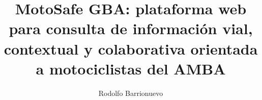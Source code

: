 \documentclass[%
    language=spanish,   %
    guias=false,        %
    pdfa=false,         %
]{usal-proyecto-final}
\title{MotoSafe GBA: plataforma web para consulta de información vial,\\
       contextual y colaborativa orientada a motociclistas del AMBA}
\author{Rodolfo Barrionuevo}
\begin{document}
    \frontmatter

    \mainmatter
    
    \glsresetall %
    
    
    
    
    
    
    

    \backmatter

    \begin{appendices}
        
        
    \end{appendices}

    \begin{anexos}
        
    \end{anexos}

    \glosarios
\end{document}
